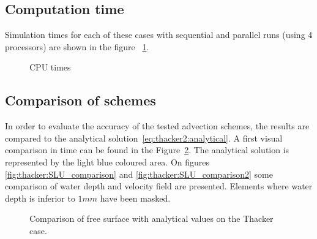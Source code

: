 \subsection{Computation time}

Simulation times for each of these cases with sequential and parallel runs (using 4 processors) are shown in the figure ~\ref{fig:thacker2:cputime}.

\begin{figure}[h!]
  \centering
  \caption{CPU times}\label{fig:thacker2:cputime}
\end{figure}

\subsection{Comparison of schemes}

In order to evaluate the accuracy of the tested advection schemes, the results are compared to the analytical solution~\ref{eq:thacker2:analytical}.
A first visual comparison in time can be found in the Figure~\ref{fig:thacker2:SLTime}.
The analytical solution is represented by the light blue coloured area. 
On figures \ref{fig:thacker:SLU_comparison} and \ref{fig:thacker:SLU_comparison2}
some comparison of water depth and velocity field are presented. Elements where water depth is inferior to $1mm$ have been masked.

\begin{figure}[H]
\begin{minipage}[t]{0.5\textwidth}
 \centering
\end{minipage}%
\begin{minipage}[t]{0.5\textwidth}
 \centering
\end{minipage}
\begin{minipage}[t]{0.5\textwidth}
 \centering
\end{minipage}%
\begin{minipage}[t]{0.5\textwidth}
 \centering
\end{minipage}
  \caption{Comparison of free surface with analytical values on the Thacker case.}
  \label{fig:thacker2:SLTime}
\end{figure}

